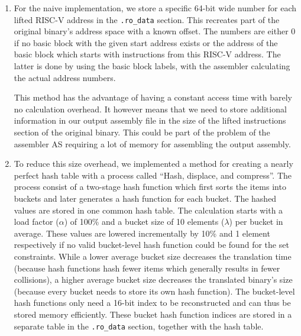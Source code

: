 \documentclass[course=eragp]{aspdoc}
\begin{document}
\begin{enumerate}
    \item For the naive implementation, we store a specific 64-bit wide number for each lifted RISC-V address
          in the \texttt{.ro\_data} section. This recreates part of the original binary's address
          space with a known offset. The numbers are either 0 if no basic block with the given start address
          exists or the address of the basic block which starts with instructions from this RISC-V address.
          The latter is done by using the basic block labels, with the assembler calculating the actual
          address numbers.
          \par
          This method has the advantage of having a constant access time with barely no calculation overhead. It
          however means that we need to store additional information in our output assembly file in the size of the
          lifted instructions section of the original binary. This could be part of the problem of the
          assembler AS requiring a lot of memory for assembling the output assembly.

    \item To reduce this size overhead, we implemented a method for creating a nearly perfect hash table with a
          process called ``Hash, displace, and compress''\cite{CHD}. The process consist of a two-stage hash
          function which first sorts the items into buckets and later generates a hash function for each
          bucket. The hashed values are stored in one common hash table. The calculation starts with a load
          factor ($\alpha$) of 100\% and a bucket size of 10 elements ($\lambda$) per bucket in average. These values are lowered
          incrementally by 10\% and 1 element respectively if no valid bucket-level hash function could be found for the
          set constraints.
          While a lower average bucket size decreases the translation time (because hash functions hash
          fewer items which generally results in fewer collisions), a higher average bucket size decreases the translated binary's size (because
          every bucket needs to store its own hash function).
          The bucket-level hash functions only need a 16-bit index to be reconstructed and can
          thus
          be stored memory efficiently. These bucket hash function indices are stored in a separate table in
          the \texttt{.ro\_data} section, together with the hash table.

          \par


\end{enumerate}
\end{document}
